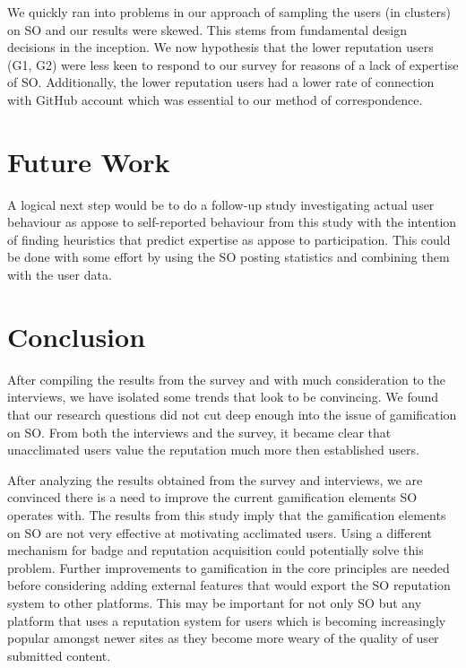 \documentclass{sigchi}
\begin{document}
We quickly ran into problems in our approach of sampling the users (in clusters) on SO and our results were skewed. This stems from fundamental design decisions in the inception. We now hypothesis that the lower reputation users (G1, G2) were less keen to respond to our survey for reasons of a lack of expertise of SO. Additionally, the lower reputation users had a lower rate of connection with GitHub account which was essential to our method of correspondence.


\section{Future Work}

A logical next step would be to do a follow-up study investigating actual user behaviour as appose to self-reported behaviour from this study with the intention of finding heuristics that predict expertise as appose to participation. This could be done with some effort by using the SO posting statistics and combining them with the user data.


\section{Conclusion}

After compiling the results from the survey and with much consideration to the interviews, we have isolated some trends that look to be convincing. We found that our research questions did not cut deep enough into the issue of gamification on SO. From both the interviews and the survey, it became clear that unacclimated users value the reputation much more then established users.

After analyzing the results obtained from the survey and interviews, we are convinced there is a need to improve the current gamification elements SO operates with. The results from this study imply that the gamification elements on SO are not very effective at motivating acclimated users. Using a different mechanism for badge and reputation acquisition could potentially solve this problem. Further improvements to gamification in the core principles are needed before considering adding external features that would export the SO reputation system to other platforms. This may be important for not only SO but any platform that uses a reputation system for users which is becoming increasingly popular amongst newer sites as they become more weary of the quality of user submitted content.
\end{document}
